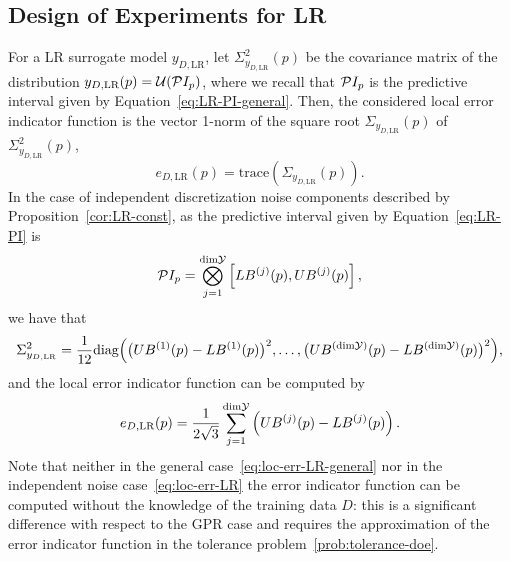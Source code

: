 \subsection{Design of Experiments for LR}\label{sec:LRAL}

For a LR surrogate model $y_{D,\text{LR}}$, let $\Sigma^2_{y_{D,\text{LR}}}(p)$ be the covariance matrix of the distribution $y_{D,\text{LR}}(p) = \mathcal U (\mathcal PI_p)$, where we recall that $\mathcal PI_p$ is the predictive interval given by Equation~\eqref{eq:LR-PI-general}.\newline
Then, the considered local error indicator function is the vector 1-norm of the square root $\Sigma_{y_{D,\text{LR}}}(p)$ of $\Sigma^2_{y_{D,\text{LR}}}(p)$,
\begin{equation} \label{eq:loc-err-LR-general}
    e_{D, \text{LR}}(p) = \text{trace}(\Sigma_{y_{D,\text{LR}}}(p)).
\end{equation}
In the case of independent discretization noise components described by Proposition~\ref{cor:LR-const}, as the predictive interval given by Equation~\eqref{eq:LR-PI} is
\begin{equation*}
    \mathcal PI_p = \bigotimes_{j=1}^{\text{dim}\mathcal Y} \left[ LB^{(j)}(p), UB^{(j)}(p)\right],
\end{equation*}
we have that
\[
    \Sigma^2_{y_{D,\text{LR}}} = \frac{1}{12} \text{diag} \Big ( \big( UB^{(1)}(p) - LB^{(1)}(p)\big)^2, \dots,\big( UB^{(\text{dim}\mathcal Y)}(p) - LB^{(\text{dim}\mathcal Y)}(p) \big)^2 \Big),
\] and the local error indicator function can be computed by 
\begin{equation} \label{eq:loc-err-LR}
    e_{D, \text{LR}}(p) = \frac{1}{2\sqrt{3}} \sum_{j=1}^{\text{dim}\mathcal Y} \left( UB^{(j)}(p) - LB^{(j)}(p) \right).
\end{equation}
Note that neither in the general case~\eqref{eq:loc-err-LR-general} nor in the independent noise case~\eqref{eq:loc-err-LR} the error indicator function can be computed without the knowledge of the training data $D$: this is a significant difference with respect to the GPR case and requires the approximation of the error indicator function in the tolerance problem~\eqref{prob:tolerance-doe}.\medbreak

